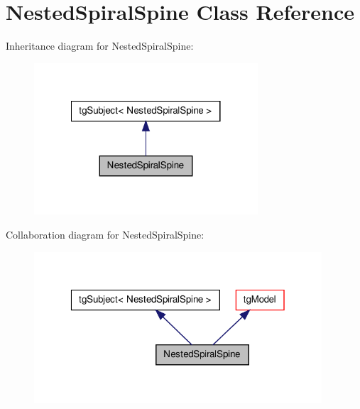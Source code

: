 \hypertarget{class_nested_spiral_spine}{\section{Nested\-Spiral\-Spine Class Reference}
\label{class_nested_spiral_spine}
}


Inheritance diagram for Nested\-Spiral\-Spine\-:\nopagebreak
\begin{figure}[H]
\begin{center}
\leavevmode
\includegraphics[width=236pt]{class_nested_spiral_spine__inherit__graph}
\end{center}
\end{figure}


Collaboration diagram for Nested\-Spiral\-Spine\-:\nopagebreak
\begin{figure}[H]
\begin{center}
\leavevmode
\includegraphics[width=304pt]{class_nested_spiral_spine__coll__graph}
\end{center}
\end{figure}
